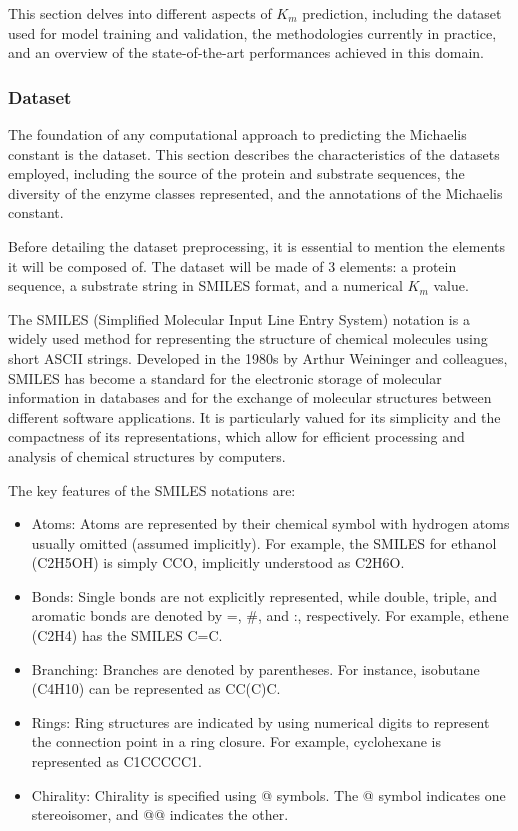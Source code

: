 This section delves into different aspects of $K_m$ prediction, including the dataset used for model training and validation, the methodologies currently in practice, and an overview of the state-of-the-art performances achieved in this domain. 

\subsubsection{Dataset}
\label{sec:dataset}
The foundation of any computational approach to predicting the Michaelis constant is the dataset. This section describes the characteristics of the datasets employed, including the source of the protein and substrate sequences, the diversity of the enzyme classes represented, and the annotations of the Michaelis constant.

Before detailing the dataset preprocessing, it is essential to mention the elements it will be composed of.
The dataset will be made of 3 elements: a protein sequence, a substrate string in SMILES format, and a numerical $K_m$ value.

The SMILES (Simplified Molecular Input Line Entry System) notation is a widely used method for representing the structure of chemical molecules using short ASCII strings. \cite{smiles} Developed in the 1980s by Arthur Weininger and colleagues, SMILES has become a standard for the electronic storage of molecular information in databases and for the exchange of molecular structures between different software applications. It is particularly valued for its simplicity and the compactness of its representations, which allow for efficient processing and analysis of chemical 
structures by computers.

The key features of the SMILES notations are:
\begin{itemize}
  \item Atoms: Atoms are represented by their chemical symbol with hydrogen atoms usually 
  omitted (assumed implicitly). For example, the SMILES for ethanol (C2H5OH) is simply CCO, 
  implicitly understood as C2H6O.
  \item Bonds: Single bonds are not explicitly represented, while double, triple, 
  and aromatic bonds are denoted by =, \#, and :, respectively. For example, ethene (C2H4) 
  has the SMILES C=C.
  \item Branching: Branches are denoted by parentheses. For instance, isobutane (C4H10) can be 
  represented as CC(C)C.
  \item Rings: Ring structures are indicated by using numerical digits to represent the 
  connection point in a ring closure. For example, cyclohexane is represented as C1CCCCC1.
  \item Chirality: Chirality is specified using @ symbols. The @ symbol indicates one stereoisomer, 
  and @@ indicates the other.
\end{itemize}


